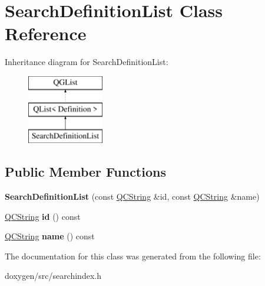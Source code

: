 \hypertarget{class_search_definition_list}{}\section{Search\+Definition\+List Class Reference}
\label{class_search_definition_list}
Inheritance diagram for Search\+Definition\+List\+:\begin{figure}[H]
\begin{center}
\leavevmode
\includegraphics[height=3.000000cm]{class_search_definition_list}
\end{center}
\end{figure}
\subsection*{Public Member Functions}
\begin{DoxyCompactItemize}
\item 
\mbox{\label{class_search_definition_list_a9d7768cbcf8c360dba4c8d3f7e98d2ac}} 
{\bfseries Search\+Definition\+List} (const \mbox{\hyperlink{class_q_c_string}{Q\+C\+String}} \&id, const \mbox{\hyperlink{class_q_c_string}{Q\+C\+String}} \&name)
\item 
\mbox{\label{class_search_definition_list_af3c6d797766c2a68c23484faa67050d0}} 
\mbox{\hyperlink{class_q_c_string}{Q\+C\+String}} {\bfseries id} () const
\item 
\mbox{\label{class_search_definition_list_a1f63fea326c05bfa8803f6deb3491ba3}} 
\mbox{\hyperlink{class_q_c_string}{Q\+C\+String}} {\bfseries name} () const
\end{DoxyCompactItemize}


The documentation for this class was generated from the following file\+:\begin{DoxyCompactItemize}
\item 
doxygen/src/searchindex.\+h\end{DoxyCompactItemize}
